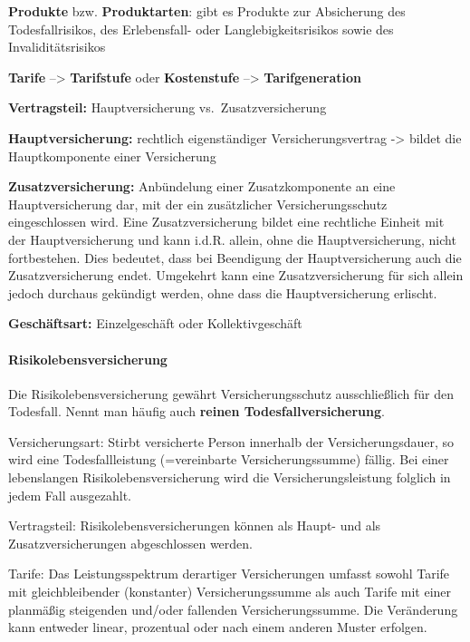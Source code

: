 \documentclass[
]{article}
\begin{document}
\textbf{Produkte} bzw. \textbf{Produktarten}: gibt es Produkte zur
Absicherung des Todesfallrisikos, des Erlebensfall- oder
Langlebigkeitsrisikos sowie des Invaliditätsrisikos

\textbf{Tarife} --\textgreater{} \textbf{Tarifstufe} oder
\textbf{Kostenstufe} --\textgreater{} \textbf{Tarifgeneration}

\textbf{Vertragsteil:} Hauptversicherung vs.~Zusatzversicherung

\textbf{Hauptversicherung:} rechtlich eigenständiger
Versicherungsvertrag -\textgreater{} bildet die Hauptkomponente einer
Versicherung

\textbf{Zusatzversicherung:} Anbündelung einer Zusatzkomponente an eine
Hauptversicherung dar, mit der ein zusätzlicher Versicherungsschutz
eingeschlossen wird. Eine Zusatzversicherung bildet eine rechtliche
Einheit mit der Hauptversicherung und kann i.d.R. allein, ohne die
Hauptversicherung, nicht fortbestehen. Dies bedeutet, dass bei
Beendigung der Hauptversicherung auch die Zusatzversicherung endet.
Umgekehrt kann eine Zusatzversicherung für sich allein jedoch durchaus
gekündigt werden, ohne dass die Hauptversicherung erlischt.

\textbf{Geschäftsart:} Einzelgeschäft oder Kollektivgeschäft

\hypertarget{risikolebensversicherung}{%
\paragraph{Risikolebensversicherung}\label{risikolebensversicherung}}

Die Risikolebensversicherung gewährt Versicherungsschutz ausschließlich
für den Todesfall. Nennt man häufig auch \textbf{reinen
Todesfallversicherung}.

Versicherungsart: Stirbt versicherte Person innerhalb der
Versicherungsdauer, so wird eine Todesfallleistung (=vereinbarte
Versicherungssumme) fällig. Bei einer lebenslangen
Risikolebensversicherung wird die Versicherungsleistung folglich in
jedem Fall ausgezahlt.

Vertragsteil: Risikolebensversicherungen können als Haupt- und als
Zusatzversicherungen abgeschlossen werden.

Tarife: Das Leistungsspektrum derartiger Versicherungen umfasst sowohl
Tarife mit gleichbleibender (konstanter) Versicherungssumme als auch
Tarife mit einer planmäßig steigenden und/oder fallenden
Versicherungssumme. Die Veränderung kann entweder linear, prozentual
oder nach einem anderen Muster erfolgen.
\end{document}
